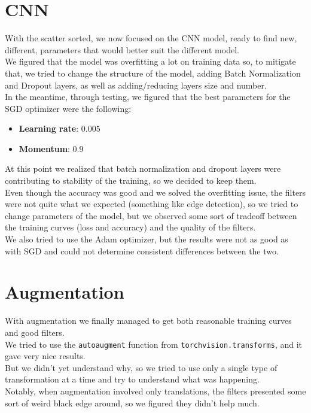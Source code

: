 \documentclass{report}
\begin{document}
\section{CNN}
With the scatter sorted, we now focused on the CNN model, ready to find new, different, parameters that would better suit the different model.\\
We figured that the model was overfitting a lot on training data so, to mitigate that, we tried to change the structure of the model, adding Batch Normalization and Dropout layers,
as well as adding/reducing layers size and number.\\
In the meantime, through testing, we figured that the best parameters for the SGD optimizer were the following:
\begin{itemize}
  \item \textbf{Learning rate}: $0.005$ 
  \item \textbf{Momentum}: $0.9$
\end{itemize}
At this point we realized that batch normalization and dropout layers were contributing to stability of the training, so we decided to keep them.\\

Even though the accuracy was good and we solved the overfitting issue, the filters were not quite what we expected (something like edge detection), so we tried to change parameters
of the model, but we observed some sort of tradeoff between the training curves (loss and accuracy) and the quality of the filters.\\
We also tried to use the Adam optimizer, but the results were not as good as with SGD and could not determine consistent differences between the two.\\

\section{Augmentation}
With augmentation we finally managed to get both reasonable training curves and good filters.\\
We tried to use the \texttt{autoaugment} function from \texttt{torchvision.transforms}, and it gave very nice results.\\

But we didn't yet understand why, so we tried to use only a single type of transformation at a time and try to understand what was happening.\\
Notably, when augmentation involved only translations, the filters presented some sort of weird black edge around, so we figured they didn't help much.\\
\end{document}
